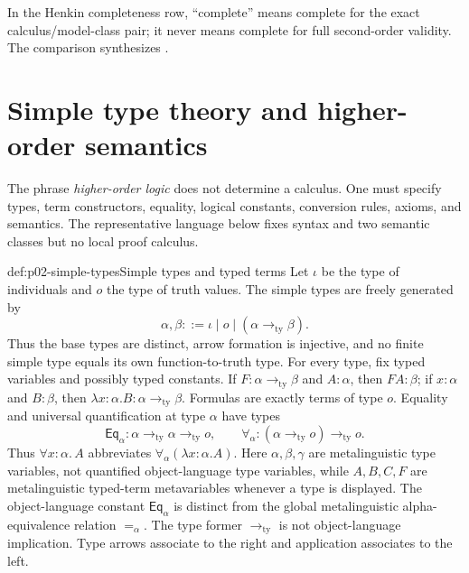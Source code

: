 In the Henkin completeness row, ``complete'' means complete for the exact
calculus/model-class pair; it never means complete for full second-order
validity.  The comparison synthesizes
\cite{Henkin1950,Manzano1996,Shapiro1991}.

\section{Simple type theory and higher-order semantics}
\label{sec:p02-simple-type-theory}

The phrase \emph{higher-order logic} does not determine a calculus.  One must
specify types, term constructors, equality, logical constants, conversion
rules, axioms, and semantics.  The representative language below fixes syntax
and two semantic classes but no local proof calculus.

\begin{hbdefinition}{def:p02-simple-types}{Simple types and typed terms}
Let \(\iota\) be the type of individuals and \(o\) the type of truth values.
The simple types are freely generated by
\[
 \alpha,\beta ::= \iota\mid o\mid(\alpha\mathbin{\to_{\mathrm{ty}}}\beta).
\]
Thus the base types are distinct, arrow formation is injective, and no finite
simple type equals its own function-to-truth type.  For every type, fix typed
variables and possibly typed constants.  If
\(F:\alpha\mathbin{\to_{\mathrm{ty}}}\beta\) and \(A:\alpha\), then
\(FA:\beta\); if \(x:\alpha\) and \(B:\beta\), then
\(\lambda x{:}\alpha.B:\alpha\mathbin{\to_{\mathrm{ty}}}\beta\).
Formulas are exactly terms of type \(o\).  Equality and universal
quantification at type \(\alpha\) have types
\[
 \mathsf{Eq}_{\alpha}:\alpha\mathbin{\to_{\mathrm{ty}}}\alpha
             \mathbin{\to_{\mathrm{ty}}}o,
 \qquad
 \forall_{\alpha}:(\alpha\mathbin{\to_{\mathrm{ty}}}o)
              \mathbin{\to_{\mathrm{ty}}}o.
\]
Thus \(\forall x{:}\alpha.\,A\) abbreviates
\(\forall_{\alpha}(\lambda x{:}\alpha.A)\).
Here \(\alpha,\beta,\gamma\) are metalinguistic type variables, not quantified
object-language type variables, while \(A,B,C,F\) are metalinguistic typed-term
metavariables whenever a type is displayed.  The object-language constant
\(\mathsf{Eq}_{\alpha}\) is distinct from the global metalinguistic
alpha-equivalence relation \(=_{\alpha}\).  The type former
\(\to_{\mathrm{ty}}\) is not object-language implication.  Type arrows
associate to the right and application associates to the left.
\end{hbdefinition}

